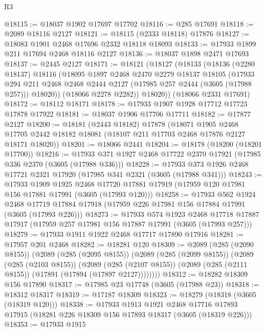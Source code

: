 \begin{lexlean}{R3}
\begin{coremodule}
@18115 := @18037 @1902 @17697 @17702
@18116 := @285 @17691
@18118 := @2089 @18116 @2127
@18121 := @18115 (@2333 @18118) @17876
@18127 := @18083 @1901 @2468 @17696 @2332 @18118 @18093
@18133 := @17933 @1899 @211 @17694 @2468 @18116 @2127
@18136 := @18037 @1898 @2471 @17693
@18137 := @2445 @2127
@18171 := @18121
    (@18127
      (@18133
        (@18136
          (@2280 @18137)
          @18116
          (@18095
            @1897
            @2468
            @2470
            @2279
            @18137
            @18105
            (@17933
              @294
              @211
              @2468
              @2468
              @2444
              @2127
              (@17985 @257 @2444 (@3605 (@17988 @257)))
              @18020))
          (@18066 @2278 @2282))
        @18020))
    (@18066 @2331 @17691)
@18172 := @18112 @18171
@18178 := @17933 @1907 @1928 @17712 @17723 @17878 @17922
@18181 := @18037 @1906 @17706 @17711
@18182 := @17877 @2127
@18200 := @18181
    (@2443 @18182)
    @17878
    (@18071
      @1905
      @2468
      @17705
      @2442
      @18182
      @18081
      (@18107 @211 @17703 @2468 @17876 @2127 @18171 @18020))
@18201 := @18066 @2441
@18204 := @18178 (@18200 (@18201 @17700))
@18216 := @17933 @371 @1927 @2468 @17722 @2370 @17921 (@17985 @336 @2370 (@3605 (@17988 @336)))
@18228 := @17933 @373 @1926 @2468 @17721 @2321 @17920 (@17985 @341 @2321 (@3605 (@17988 @341)))
@18243 := @17933
    @1909
    @1925
    @2468
    @17720
    @17881
    @17919
    (@17959 @120 @17981 @156 @17881 @17991 (@3605 (@17993 @120)))
@18258 := @17933
    @562
    @1924
    @2468
    @17719
    @17884
    @17918
    (@17959 @226 @17981 @156 @17884 @17991 (@3605 (@17993 @226)))
@18273 := @17933
    @574
    @1923
    @2468
    @17718
    @17887
    @17917
    (@17959 @257 @17981 @156 @17887 @17991 (@3605 (@17993 @257)))
@18279 := @17933 @1911 @1922 @2468 @17717 @17890 @17916
@18281 := @17957 @201 @2468
@18282 := @18281 @120
@18309 := @2089
    (@285 (@2090 @8155))
    (@2089
      (@285 (@2095 @8155))
      (@2089
        (@285 (@2099 @8155))
        (@2089
          (@285 (@2103 @8155))
          (@2089
            (@285 (@2107 @8155))
            (@2089 (@285 (@2111 @8155)) (@17891 (@17894 (@17897 @2127))))))))
@18312 := @18282 @18309 @156 @17890
@18317 := @17985 @23 @17748 (@3605 (@17988 @23))
@18318 := @18312 @18317
@18319 := @17187 @18309
@18323 := @18279 (@18318 (@3605 (@18319 @120)))
@18338 := @17933
    @1913
    @1921
    @2468
    @17716
    @17893
    @17915
    (@18281 @226 @18309 @156 @17893 @18317 (@3605 (@18319 @226)))
@18353 := @17933
    @1915

\end{coremodule}
\end{lexlean}
